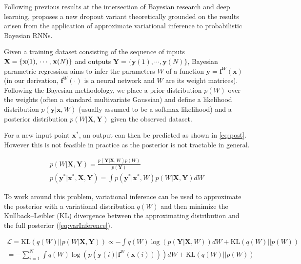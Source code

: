 Following previous results at the intersection of Bayesian research and deep learning, \cite{gal2016theoretically} proposes a new dropout variant theoretically grounded on the results arisen from the application of approximate variational inference to probabilistic Bayesian RNNs. 

Given a training dataset consisting of the sequence of inputs $\mathbf{X}=\{\mathbf{x}(1),\\\cdots,\mathbf{x}(N)\}$ and outputs $\mathbf{Y}=\{\mathbf{y}(1),\cdots,\mathbf{y}(N)\}$, Bayesian parametric regression aims to infer the parameters $W$ of a function $\mathbf{y}=\mathbf{f}^W(\mathbf{x})$ (in our derivation, $\mathbf{f}^W(\cdot)$ is a neural network and $W$ are its weight matrices). Following the Bayesian methodology, we place a prior distribution $p(W)$ over the weights (often a standard multivariate Gaussian) and define a likelihood distribution $p(\mathbf{y} |\mathbf{x}, W)$ (usually assumed to be a softmax likelihood) and a posterior distribution $p(W | \mathbf{X}, \mathbf{Y})$ given the observed dataset.

For a new input point $\mathbf{x^*}$, an output can then be predicted as shown in \autoref{eq:post}. However this is not feasible in practice as the posterior is not tractable in general. 

\begin{equation} \label{eq:post}
\begin{gathered}
	p(W | \mathbf{X}, \mathbf{Y}) = \frac{ p(\mathbf{Y} | \mathbf{X}, W) p(W) }{ p( \mathbf{Y} ) } \\
	p(\mathbf{y^*} | \mathbf{x^*}, \mathbf{X}, \mathbf{Y}) = \int p(\mathbf{y^*} | \mathbf{x^*}, W) p(W | \mathbf{X}, \mathbf{Y}) dW
\end{gathered}
\end{equation}

To work around this problem, variational inference can be used to approximate the posterior with a variational distribution $q(W)$ and then
minimize the Kullback–Leibler (KL) divergence between the approximating distribution and the full posterior (\autoref{eq:varInference}). 

\begin{equation} \label{eq:varInference}
\begin{gathered}
	\mathcal{L}=\text{KL}(q(W)||p(W | \mathbf{X}, \mathbf{Y})) \propto - \int q(W) \log(p(\mathbf{Y} | \mathbf{X}, W))dW + \text{KL}(q(W)||p(W))\\
	= - \sum_{i=1}^{N} \int q(W) \log(p(\mathbf{y}(i) | \mathbf{f}^W(\mathbf{x}(i))))dW + \text{KL}(q(W)||p(W))
\end{gathered}
\end{equation}

